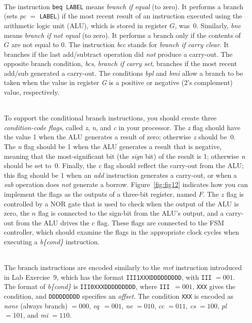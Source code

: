 \documentclass[epsfig,10pt,fullpage]{article} \addtolength{\textwidth}{1.5in}
\begin{document}
~\\
\noindent
The instruction \texttt{beq  LABEL} means {\it branch if equal} (to zero). It performs a branch 
(sets {\it pc} $=$ \texttt{LABEL}) if the most recent result of an instruction 
executed using the arithmetic logic unit (ALU), which is stored in register $G$, was~0. 
Similarly, {\it bne} means {\it branch if not
equal} (to zero).  It performs a branch only if the contents of $G$ are not equal to 0.
The instruction {\it bcc} stands for {\it branch if carry clear}. It branches if the last
add/subtract operation did {\it not} produce a carry-out. The opposite branch condition, 
{\it bcs}, {\it branch if carry set}, branches if the most recent add/sub generated a 
carry-out. The conditions {\it bpl} and {\it bmi} allow a branch to be taken when the value 
in register {\it G} is a positive or negative (2's complement) value,
respectively. 

~\\
\noindent
To support the conditional branch instructions, you should create three
{\it condition-code flags}, called {\it z}, {\it n}, and {\it c} in your processor. 
The {\it z} flag should have the value 1 when the ALU generates a result of zero; 
otherwise {\it z} should be~0.  The {\it n} flag should be 1 when the ALU generates a 
result that is negative, meaning that the most-significant bit (the {\it sign} bit) of the
result is 1; 
otherwise {\it n} should be set to~0. Finally, the {\it c} flag should reflect the carry-out 
from the ALU; this flag should be 1 when an {\it add} instruction generates a carry-out, or 
when a {\it sub} operation does {\it not} generate a borrow. Figure~\ref{fig:fig12} 
indicates how you can implement the flags as the outputs of a three-bit
register, named $F$. The $z$ flag is controlled by a NOR gate that is 
used to check when the output of the ALU 
is zero, the $n$ flag is connected to the sign-bit from the ALU's output, and a carry-out 
from the ALU drives the $c$ flag. These flags are connected to the FSM controller, which 
should examine the flags in the appropriate clock cycles when executing a {\it b\{cond\}}
instruction.

~\\
\noindent
The branch instructions are encoded similarly to the {\it mvt} instruction introduced
in Lab Exercise~9, which has the format \texttt{III1XXXDDDDDDDDD}, with \texttt{III} $= 001$.
The format of {\it b\{cond\}} is \texttt{III0XXXDDDDDDDDD}, where \texttt{III}~$= 001$,
\texttt{XXX} gives the condition, and \texttt{DDDDDDDDD} specifies an {\it offset}.
The condition \texttt{XXX} is encoded
as {\it none} (always branch) $= 000$, {\it eq}~$= 001$, {\it ne} $= 010$, {\it cc} $= 011$, 
{\it cs} $= 100$, {\it pl} $= 101$, and {\it mi} $= 110$.
\end{document}
